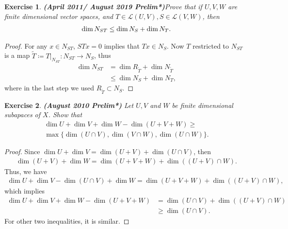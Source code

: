 \documentclass[10pt]{book}
\newtheorem{exercise}{Exercise}[section]
\theoremstyle{definition}
\numberwithin{equation}{chapter}
\begin{document}
\medskip

\begin{exercise}{\bf (April 2011/ August 2019 Prelim*)}\label{April_2011_p1}
Prove that if $U,V,W$ are finite dimensional vector spaces, and $T\in\mathscr{L}(U,V), S\in\mathscr{L}(V,W)$, then
\begin{align*}
    {\rm dim}\, N_{ST} \leq {\rm dim}\, N_S + {\rm dim}\, N_T.
\end{align*}
\end{exercise}
\begin{proof}
For any $x \in N_{ST}$, $STx = 0$ implies that $Tx \in N_S$. Now $T$ restricted to $N_{ST}$ is a map $\widetilde{T} \coloneqq T|_{N_{ST}}: N_{ST} \to N_S$, thus
\begin{align*}
    \dim N_{ST} & = \dim R_{\widetilde{T}} + \dim N_{\widetilde{T}} \\
    & \leq \dim N_S + \dim N_T,
\end{align*}
where in the last step we used $R_{\widetilde{T}} \subset N_S$.
\end{proof}

\medskip

\begin{exercise}{\bf (August 2010 Prelim*)}
Let $U, V$ and $W$ be finite dimensional subapaces of $X$. Show that
\begin{align*}
    \dim U + \dim V + \dim W - \dim (U + V + W) \geq \\
    \max \{\dim(U \cap V), \dim(V \cap W), \dim(U \cap W)\}.
\end{align*}
\end{exercise}
\begin{proof}
Since $\dim U + \dim V = \dim (U + V) + \dim (U \cap V)$, then 
\begin{align*}
    \dim (U+V) + \dim W = \dim (U + V + W) + \dim ((U+V) \cap W).
\end{align*}
Thus, we have
\begin{align*}
    \dim U + \dim V - \dim (U \cap V) + \dim W = \dim (U + V + W) + \dim ((U+V) \cap W),
\end{align*}
which implies
\begin{align*}
    \dim U + \dim V + \dim W - \dim (U + V + W) & = \dim (U \cap V) + \dim ((U+V) \cap W) \\
    & \geq \dim (U \cap V).
\end{align*}
For other two inequalities, it is similar.
\end{proof}

\medskip
\end{document}
